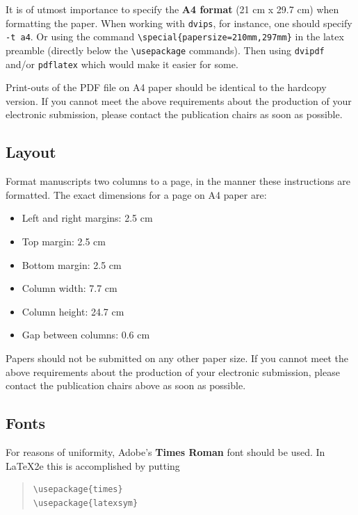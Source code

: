 It is of utmost importance to specify the \textbf{A4 format} (21 cm x 29.7 cm) when formatting the paper. When working with
{\tt dvips}, for instance, one should specify {\tt -t a4}. Or using the command \verb|\special{papersize=210mm,297mm}| in the latex preamble (directly below the \verb|\usepackage| commands). Then using 
{\tt dvipdf} and/or {\tt pdflatex} which would make it easier for some.

Print-outs of the PDF file on A4 paper should be identical to the hardcopy version. If you cannot meet the above requirements about the production of your electronic submission, please contact the publication chairs as soon as possible.

\subsection{Layout}
\label{ssec:layout}

Format manuscripts two columns to a page, in the manner these instructions are formatted. The exact dimensions for a page on A4 paper are:

\begin{itemize}
\item Left and right margins: 2.5 cm \item Top margin: 2.5 cm \item Bottom margin: 2.5 cm \item Column width: 7.7 cm \item Column height: 24.7 cm \item Gap between columns: 0.6 cm
\end{itemize}

 Papers should not be submitted on any other paper size. If you cannot meet the above requirements about the production of your electronic submission, please contact the publication chairs above as soon as possible.

\subsection{Fonts}

For reasons of uniformity, Adobe's {\bf Times Roman} font should be used. In \LaTeX2e{} this is accomplished by putting

\begin{quote}
\begin{verbatim}
\usepackage{times}
\usepackage{latexsym}
\end{verbatim}
\end{quote}

